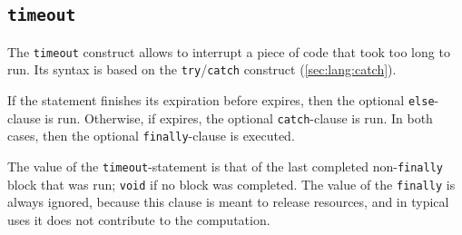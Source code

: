 \subsection{\lstinline{timeout}}
\label{sec:lang:timeout}

The \lstinline{timeout} construct allows to interrupt a piece of code that
took too long to run.  Its syntax is based on the
\lstinline{try}/\lstinline{catch} construct (\autoref{sec:lang:catch}).


If the statement finishes its expiration before  expires, then
the optional \lstinline{else}-clause is run.  Otherwise, if 
expires, the optional \lstinline{catch}-clause is run.  In both cases, then
the optional \lstinline{finally}-clause is executed.

The value of the \lstinline{timeout}-statement is that of the last
completed non-\lstinline{finally} block that was run; \lstinline{void} if
no block was completed.  The value of the \lstinline{finally} is always
ignored, because this clause is meant to release resources, and in typical
uses it does not contribute to the computation.

